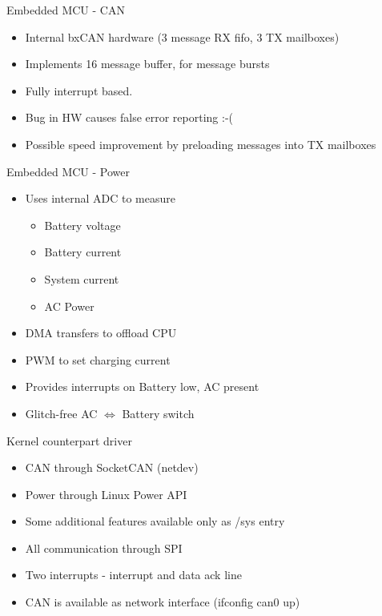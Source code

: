\documentclass{beamer}
\begin{document}
\begin{frame}{Embedded MCU - CAN}
\begin{itemize}
	\item Internal bxCAN hardware (3 message RX fifo, 3 TX mailboxes)
	\item Implements 16 message buffer, for message bursts 
	\item Fully interrupt based.
\end{itemize}

\begin{itemize}
\item Bug in HW causes false error reporting :-(
\item Possible speed improvement by preloading messages into TX mailboxes 
\end{itemize}
\end{frame}

\begin{frame}{Embedded MCU - Power}
\begin{itemize}
	\item Uses internal ADC to measure
	\begin{itemize}
		\item Battery voltage
		\item Battery current
		\item System current
		\item AC Power
	\end{itemize}
	\item DMA transfers to offload CPU
	\item PWM to set charging current
	\item Provides interrupts on Battery low, AC present
	\item Glitch-free AC \(\Leftrightarrow\) Battery switch
\end{itemize}
\end{frame}

\begin{frame}{Kernel counterpart driver}
\begin{itemize}
	\item CAN through SocketCAN (netdev)
	\item Power through Linux Power API
	\item Some additional features available only as /sys entry

	\item All communication through SPI
	\item Two interrupts - interrupt and data ack line

	\item CAN is available as network interface (ifconfig can0 up)
\end{itemize}
\end{frame}
\end{document}
